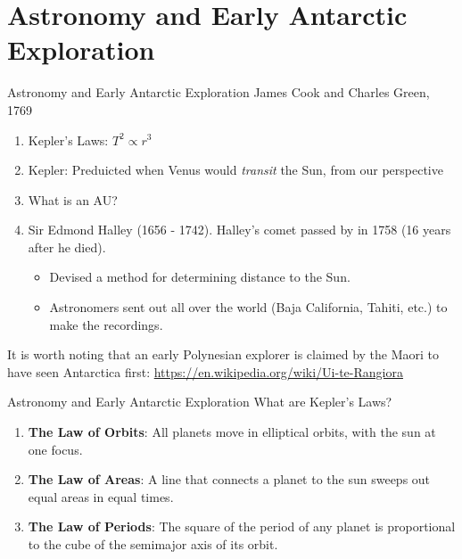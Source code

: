 \documentclass{beamer}
\begin{document}
\section{Astronomy and Early Antarctic Exploration}

\begin{frame}{Astronomy and Early Antarctic Exploration}
James Cook and Charles Green, 1769
\begin{enumerate}
\item Kepler's Laws: $T^2 \propto r^3$
\item Kepler: Preduicted when Venus would \textit{transit} the Sun, from our perspective
\item What is an AU?
\item Sir Edmond Halley (1656 - 1742).  Halley's comet passed by in 1758 (16 years after he died).
\begin{itemize}
\item Devised a method for determining distance to the Sun.
\item Astronomers sent out all over the world (Baja California, Tahiti, etc.) to make the recordings.
\end{itemize}
\end{enumerate}
It is worth noting that an early Polynesian explorer is claimed by the Maori to have seen Antarctica first: \url{https://en.wikipedia.org/wiki/Ui-te-Rangiora}
\end{frame}

\begin{frame}{Astronomy and Early Antarctic Exploration}
What are Kepler's Laws?
\begin{enumerate}
\item \textbf{The Law of Orbits}: All planets move in elliptical orbits, with the sun at one focus.
\item \textbf{The Law of Areas}: A line that connects a planet to the sun sweeps out equal areas in equal times.
\item \textbf{The Law of Periods}: The square of the period of any planet is proportional to the cube of the semimajor axis of its orbit.
\end{enumerate}
\end{frame}
\end{document}
